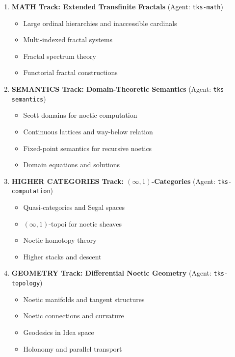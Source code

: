 \documentclass[11pt,twoside,openright]{book}
\theoremstyle{definition}
\theoremstyle{plain}
\theoremstyle{remark}
\begin{document}
\begin{enumerate}
  \item \textbf{MATH Track: Extended Transfinite Fractals} (Agent: \texttt{tks-math})
  \begin{itemize}
    \item Large ordinal hierarchies and inaccessible cardinals
    \item Multi-indexed fractal systems
    \item Fractal spectrum theory
    \item Functorial fractal constructions
  \end{itemize}

  \item \textbf{SEMANTICS Track: Domain-Theoretic Semantics} (Agent: \texttt{tks-semantics})
  \begin{itemize}
    \item Scott domains for noetic computation
    \item Continuous lattices and way-below relation
    \item Fixed-point semantics for recursive noetics
    \item Domain equations and solutions
  \end{itemize}

  \item \textbf{HIGHER CATEGORIES Track: $(\infty,1)$-Categories} (Agent: \texttt{tks-computation})
  \begin{itemize}
    \item Quasi-categories and Segal spaces
    \item $(\infty,1)$-topoi for noetic sheaves
    \item Noetic homotopy theory
    \item Higher stacks and descent
  \end{itemize}

  \item \textbf{GEOMETRY Track: Differential Noetic Geometry} (Agent: \texttt{tks-topology})
  \begin{itemize}
    \item Noetic manifolds and tangent structures
    \item Noetic connections and curvature
    \item Geodesics in Idea space
    \item Holonomy and parallel transport
  \end{itemize}
\end{enumerate}
\end{document}
